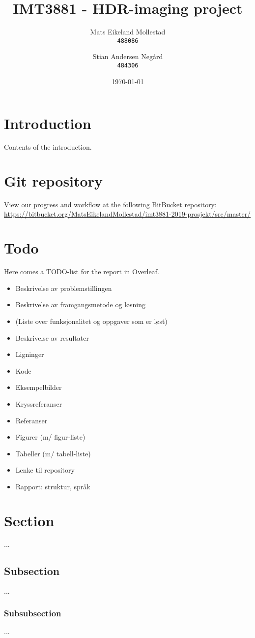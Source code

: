 \documentclass{article}
\title{IMT3881 - HDR-imaging project}
\author{
  Mats Eikeland Mollestad\\
  \texttt{488086}
  \and
  Stian Andersen Negård\\
  \texttt{484306}
}
\date{\today}
\newcommand{\link}[1]{{\color{blue}\footnotesize \url{#1}}}
\begin{document}
\maketitle %
\newpage

\section*{Introduction}
Contents of the introduction.

\section*{Git repository}
View our progress and workflow at the following BitBucket repository:\newline
\link{https://bitbucket.org/MatsEikelandMollestad/imt3881-2019-prosjekt/src/master/}
\newpage

\tableofcontents
{} %
\newpage


\section{Todo}
Here comes a TODO-list for the report in Overleaf. \par

\begin{itemize}
\item Beskrivelse av problemstillingen
\item Beskrivelse av framgangsmetode og løsning
\item (Liste over funksjonalitet og oppgaver som er løst)
\item Beskrivelse av resultater
\item Ligninger
\item Kode
\item Eksempelbilder
\item Kryssreferanser
\item Referanser
\item Figurer (m/ figur-liste)
\item Tabeller (m/ tabell-liste)
\item Lenke til repository
\item Rapport: struktur, språk 
\end{itemize}
\newpage

\section{Section}
...
\subsection{Subsection}
...
\subsubsection{Subsubsection}
...
\end{document}
